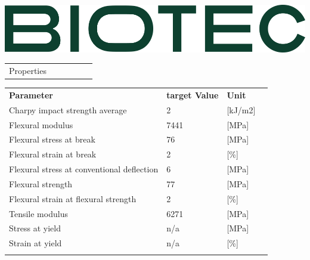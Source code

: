 \documentclass{article}
\begin{document}
\includegraphics[scale=0.20]{biotec}
\begin{center}

	\begin{tabularx}{\textwidth}{ X l X l X l}
		\rowcolor{LightCyan} Properties &  & \\
	\end{tabularx}
	\begin{paracol}{2}

		\begin{tabularx}{0.5\textwidth}{ X l l l}
			\textbf{Parameter}                         & \textbf{target Value}& \textbf{Unit} &\\
			\arrayrulecolor{line_color}\hline
			Charpy impact strength average             & 2                    & [kJ/m2]       &\\
			\arrayrulecolor{line_color}\hline
			Flexural modulus                           & 7441                 & [MPa]         &\\
			\arrayrulecolor{line_color}\hline
			Flexural stress at break                   & 76                   & [MPa]         &\\
			\arrayrulecolor{line_color}\hline
			Flexural strain at break                   & 2                    & [\%]          &\\
			\arrayrulecolor{line_color}\hline
			Flexural stress at conventional deflection & 6                    & [MPa]         &\\
			\arrayrulecolor{line_color}\hline
			Flexural strength                          & 77                   & [MPa]         &\\
			\arrayrulecolor{line_color}\hline
			Flexural strain at flexural strength       & 2                    & [\%]          &\\
			\arrayrulecolor{line_color}\hline
			Tensile modulus                            & 6271                 & [MPa]         &\\
			\arrayrulecolor{line_color}\hline
			Stress at yield                            & n/a                  & [MPa]         &\\
			\arrayrulecolor{line_color}\hline
			Strain at yield                            & n/a                  & [\%]          &\\
			\arrayrulecolor{line_color}\hline

\end{tabularx}
\end{paracol}
\end{center}
\end{document}

